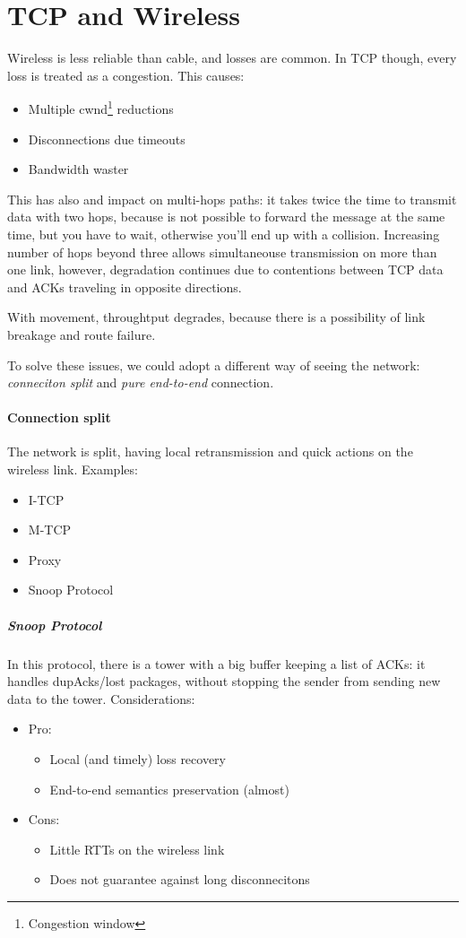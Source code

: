 \section{TCP and Wireless}

Wireless is less reliable than cable, and losses are common. In TCP though,
every loss is treated as a congestion. This causes:
\begin{itemize}
\item Multiple cwnd\footnote{Congestion window} reductions
\item Disconnections due timeouts
\item Bandwidth waster
\end{itemize}

This has also and impact on multi-hops paths: it takes twice the time to
transmit data with two hops, because is not possible to forward the message at
the same time, but you have to wait, otherwise you'll end up with a collision.
Increasing number of hops beyond three allows simultaneouse transmission on more
than one link, however, degradation continues due to contentions between TCP
data and ACKs traveling in opposite directions.

With movement, throughtput degrades, because there is a possibility of link
breakage and route failure.

To solve these issues, we could adopt a different way of seeing the network:
\textit{conneciton split} and \textit{pure end-to-end} connection.

\paragraph*{Connection split} The network is split, having local retransmission
and quick actions on the wireless link.
Examples:
\begin{itemize}
\item I-TCP
\item M-TCP
\item Proxy
\item Snoop Protocol
\end{itemize}

\subparagraph*{Snoop Protocol} In this protocol, there is a tower with a big
buffer keeping a list of ACKs: it handles dupAcks/lost packages, without
stopping the sender from sending new data to the tower.
Considerations:
\begin{itemize}
\item Pro:
  \begin{itemize}
  \item Local (and timely) loss recovery
  \item End-to-end semantics preservation (almost)
  \end{itemize}
\item Cons:
  \begin{itemize}
  \item Little RTTs on the wireless link
  \item Does not guarantee against long disconnecitons
  \end{itemize}
\end{itemize}

